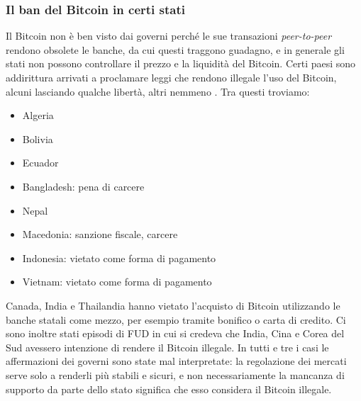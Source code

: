 \documentclass {article}
\begin{document}
\subsubsection {Il ban del Bitcoin in certi stati}

Il Bitcoin non è ben visto dai governi perché le sue transazioni \textit{peer-to-peer} rendono obsolete le banche, da cui questi traggono guadagno, e in generale gli stati non possono controllare il prezzo e la liquidità del Bitcoin.
Certi paesi sono addirittura arrivati a proclamare leggi che rendono illegale l'uso del Bitcoin, alcuni lasciando qualche libertà, altri nemmeno \cite{legality}.
Tra questi troviamo:

\begin{itemize}
\item Algeria
\item Bolivia
\item Ecuador
\item Bangladesh: pena di carcere
\item Nepal
\item Macedonia: sanzione fiscale, carcere
\item Indonesia: vietato come forma di pagamento
\item Vietnam: vietato come forma di pagamento
\end{itemize}
%
Canada, India e Thailandia hanno vietato l'acquisto di Bitcoin utilizzando le banche statali come mezzo, per esempio tramite bonifico o carta di credito.
Ci sono inoltre stati episodi di FUD in cui si credeva che India, Cina e Corea del Sud avessero intenzione di rendere il Bitcoin illegale.
In tutti e tre i casi le affermazioni dei governi sono state mal interpretate: la regolazione dei mercati serve solo a renderli più stabili e sicuri, e non necessariamente la mancanza di supporto da parte dello stato significa che esso considera il Bitcoin illegale.
%
\end{document}
